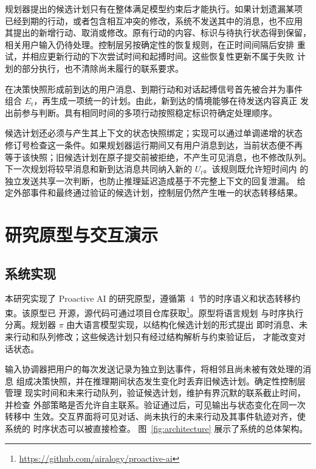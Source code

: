 \documentclass[manuscript,nonacm]{acmart}
\begin{document}
规划器提出的候选计划只有在整体满足模型约束后才能执行。如果计划遗漏某项
已经到期的行动，或者包含相互冲突的修改，系统不发送其中的消息，也不应用
其提出的新增行动、取消或修改。原有行动的内容、标识与待执行状态得到保留，
相关用户输入仍待处理。控制层另按确定性的恢复规则，在正时间间隔后安排
重试，并相应更新行动的下次尝试时间和起搏时间。这些恢复性更新不属于失败
计划的部分执行，也不清除尚未履行的联系要求。

在决策快照形成前到达的用户消息、到期行动和对话起搏信号首先被合并为事件
组合 $E_t$，再生成一项统一的计划。由此，新到达的情境能够在待发送内容真正
发出前参与判断。具有相同时间的多项行动按照稳定标识符确定处理顺序。

候选计划还必须与产生其上下文的状态快照绑定；实现可以通过单调递增的状态
修订号检查这一条件。如果规划器运行期间又有用户消息到达，当前状态便不再
等于该快照；旧候选计划在原子提交前被拒绝，不产生可见消息，也不修改队列。
下一次规划将较早消息和新到达消息共同纳入新的 $U_t$。该规则既允许短时间内
的独立发送共享一次判断，也防止推理延迟造成基于不完整上下文的回复泄漏。
给定外部事件和最终通过验证的候选计划，控制层仍然产生唯一的状态转移结果。

\section{研究原型与交互演示}

\subsection{系统实现}

本研究实现了 Proactive AI 的研究原型，遵循第~4~节的时序语义和状态转移约束。该原型已
开源，源代码可通过项目仓库获取\footnote{%
\url{https://github.com/airalogy/proactive-ai}}。原型将语言规划
与时序执行分离。规划器 $\pi$ 由大语言模型实现，以结构化候选计划的形式提出
即时消息、未来行动和队列修改；这些候选计划只有经过结构解析与约束验证后，
才能改变对话状态。

输入协调器把用户的每次发送记录为独立到达事件，将相邻且尚未被有效处理的消息
组成决策快照，并在推理期间状态发生变化时丢弃旧候选计划。确定性控制层管理
现实时间和未来行动队列，验证候选计划，维护有界沉默的联系截止时间，并检查
外部策略是否允许自主联系。验证通过后，可见输出与状态变化在同一次转移中
生效。交互界面将可见对话、尚未执行的未来行动及其事件轨迹对齐，使系统的
时序状态可以被直接检查。
图~\ref{fig:architecture} 展示了系统的总体架构。
\end{document}
